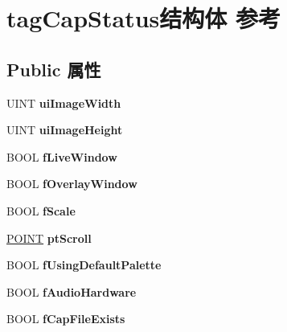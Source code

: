 \hypertarget{structtag_cap_status}{}\section{tag\+Cap\+Status结构体 参考}
\label{structtag_cap_status}
\subsection*{Public 属性}
\begin{DoxyCompactItemize}
\item 
\mbox{\label{structtag_cap_status_a3eee0abdf7006ecffe5a8878c03e4d95}} 
U\+I\+NT {\bfseries ui\+Image\+Width}
\item 
\mbox{\label{structtag_cap_status_adfb099d6770f5bff32092d17cbc9014e}} 
U\+I\+NT {\bfseries ui\+Image\+Height}
\item 
\mbox{\label{structtag_cap_status_a4d32978fb72652a4d0a6ff5d5cc2e40b}} 
B\+O\+OL {\bfseries f\+Live\+Window}
\item 
\mbox{\label{structtag_cap_status_aef5aec91cb44157958c4761196b667ac}} 
B\+O\+OL {\bfseries f\+Overlay\+Window}
\item 
\mbox{\label{structtag_cap_status_ae28cb91346a26913eac67012c3d04c77}} 
B\+O\+OL {\bfseries f\+Scale}
\item 
\mbox{\label{structtag_cap_status_a670b871227b75189a6d8d428157d281b}} 
\hyperlink{structtag_p_o_i_n_t}{P\+O\+I\+NT} {\bfseries pt\+Scroll}
\item 
\mbox{\label{structtag_cap_status_a8b606a7ba48a8a06318e3b2b2f375f69}} 
B\+O\+OL {\bfseries f\+Using\+Default\+Palette}
\item 
\mbox{\label{structtag_cap_status_a992dc3064305d2ce58fb9c8cf964ded5}} 
B\+O\+OL {\bfseries f\+Audio\+Hardware}
\item 
\mbox{\label{structtag_cap_status_a70c82d33b8aa179369948743c79b1e32}} 
B\+O\+OL {\bfseries f\+Cap\+File\+Exists}

\end{DoxyCompactItemize}
